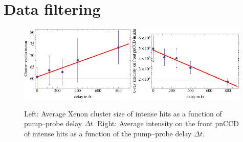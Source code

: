 \section{Data filtering}\label{sec:hitfinding}
\begin{figure}
	\centering
		\includegraphics[width=0.49\textwidth]{images/filter-size.eps}
		\includegraphics[width=0.49\textwidth]{images/filter-sum-frontpnCCD.eps}
	\caption[Average cluster size correlated to measured intensity on front pnCCD.]{Left: Average Xenon cluster size of intense hits as a function of pump--probe delay $\Delta t$. Right: Average intensity on the front pnCCD of intense hits as a function of the pump--probe delay $\Delta t$.}
	\label{fig:filter-size-intensity}
\end{figure}
